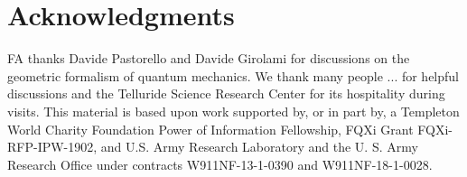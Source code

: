 \documentclass[draft,nofootinbib,prl,twocolumn,showpacs,showkeys,groupaddress,preprintnumbers,floatfix]{revtex4-1}
\newcommand{\1}{\mathbbm{1}}
\begin{document}
\section*{Acknowledgments}
\label{sec:acknowledgments}
FA thanks Davide Pastorello and Davide Girolami for discussions on the
geometric formalism of quantum mechanics. We thank many people ... for helpful
discussions and the Telluride Science Research Center for its hospitality
during visits. This material is based upon work supported by, or in part by, a
Templeton World Charity Foundation Power of Information Fellowship, FQXi
Grant FQXi-RFP-IPW-1902, and U.S. Army Research Laboratory and the U. S. Army
Research Office under contracts W911NF-13-1-0390 and W911NF-18-1-0028.


\end{document}
